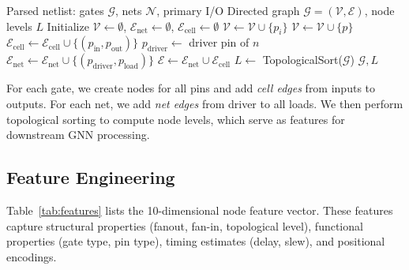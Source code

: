 \begin{algorithm}[t]
\caption{Heterogeneous DAG Construction}
\label{alg:dag_build}
\begin{algorithmic}[1]
\REQUIRE Parsed netlist: gates $\mathcal{G}$, nets $\mathcal{N}$, primary I/O
\ENSURE Directed graph $\mathcal{G} = (\mathcal{V}, \mathcal{E})$, node levels $L$
\STATE Initialize $\mathcal{V} \leftarrow \emptyset$, $\mathcal{E}_{\text{net}} \leftarrow \emptyset$, $\mathcal{E}_{\text{cell}} \leftarrow \emptyset$
    \STATE $\mathcal{V} \leftarrow \mathcal{V} \cup \{p_i\}$
\ENDFOR
{}
        \STATE $\mathcal{V} \leftarrow \mathcal{V} \cup \{p\}$
    \ENDFOR
        \STATE $\mathcal{E}_{\text{cell}} \leftarrow \mathcal{E}_{\text{cell}} \cup \{(p_{\text{in}}, p_{\text{out}})\}$ 
    \ENDFOR
\ENDFOR
{}
    \STATE $p_{\text{driver}} \leftarrow$ driver pin of $n$
        \STATE $\mathcal{E}_{\text{net}} \leftarrow \mathcal{E}_{\text{net}} \cup \{(p_{\text{driver}}, p_{\text{load}})\}$
    \ENDFOR
\ENDFOR
\STATE $\mathcal{E} \leftarrow \mathcal{E}_{\text{net}} \cup \mathcal{E}_{\text{cell}}$
\STATE $L \leftarrow$ TopologicalSort($\mathcal{G}$)
\RETURN $\mathcal{G}, L$
\end{algorithmic}
\end{algorithm}

For each gate, we create nodes for all pins and add \textit{cell edges} from inputs to outputs. For each net, we add \textit{net edges} from driver to all loads. We then perform topological sorting to compute node levels, which serve as features for downstream GNN processing.

\subsection{Feature Engineering}
\label{sec:features}

Table~\ref{tab:features} lists the 10-dimensional node feature vector. These features capture structural properties (fanout, fan-in, topological level), functional properties (gate type, pin type), timing estimates (delay, slew), and positional encodings.

